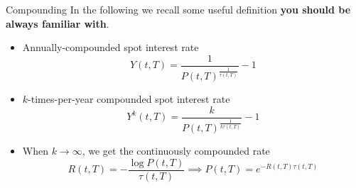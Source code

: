 \documentclass{beamer}
\begin{document}
\begin{frame}{Compounding}
	In the following we recall some useful definition \textbf{you should be always familiar with}.
	\begin{itemize}
		\item Annually-compounded spot interest rate
		\begin{equation}
			Y(t, T)= \frac{1}{P(t, T)^{\frac{1}{\tau(t,T)}}}-1
		\end{equation}
		\item $k$-times-per-year compounded spot interest rate
		\begin{equation}
			Y^k(t, T)= \frac{k}{P(t, T)^{\frac{1}{k\tau(t,T)}}}-1
		\end{equation}
		\item When $k\rightarrow\infty$, we get the continuously compounded rate
		\begin{equation}
			R(t,T)=-\frac{\log P(t,T)}{\tau(t,T)} \implies P(t,T)=e^{-R(t,T)\tau(t,T)}
		\end{equation}
	\end{itemize}
\end{frame}

\end{document}
